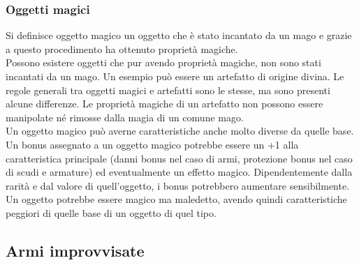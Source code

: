 \documentclass[../manuale_main.tex]{subfiles}
\begin{document}
\subsubsection{Oggetti magici}

Si definisce oggetto magico un oggetto che è stato incantato da un mago e grazie a questo procedimento ha ottenuto proprietà magiche.\\
Possono esistere oggetti che pur avendo proprietà magiche, non sono stati incantati da un mago. Un esempio può essere un artefatto di origine divina. Le regole generali tra oggetti magici e artefatti sono le stesse, ma sono presenti alcune differenze. Le proprietà magiche di un artefatto non possono essere manipolate né rimosse dalla magia di un comune mago.\\

Un oggetto magico può averne caratteristiche anche molto diverse da quelle base.
Un bonus assegnato a un oggetto magico potrebbe essere un +1 alla caratteristica principale (danni bonus nel caso di armi, protezione bonus nel caso di scudi e armature) ed eventualmente un effetto magico.
Dipendentemente dalla rarità e dal valore di quell'oggetto, i bonus potrebbero aumentare sensibilmente.
Un oggetto potrebbe essere magico ma maledetto, avendo quindi caratteristiche peggiori di quelle base di un oggetto di quel tipo.

\subsection{Armi improvvisate}
\end{document}
